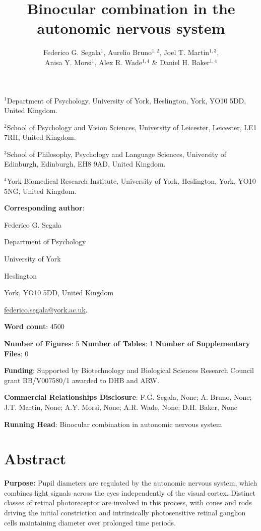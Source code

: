 \documentclass[
]{article}
\title{Binocular combination in the autonomic nervous system}
\author{Federico G. Segala\(^1\), Aurelio Bruno\(^{1,2}\), Joel T. Martin\(^{1,3}\),\\
Anisa Y. Morsi\(^1\), Alex R. Wade\(^{1,4}\) \& Daniel H. Baker\(^{1,4}\)}
\date{}
\begin{document}
\maketitle

\(^1\)Department of Psychology, University of York, Heslington, York, YO10 5DD, United Kingdom.

\(^2\)School of Psychology and Vision Sciences, University of Leicester, Leicester, LE1 7RH, United Kingdom.

\(^3\)School of Philosophy, Psychology and Language Sciences, University of Edinburgh, Edinburgh, EH8 9AD, United Kingdom.

\(^4\)York Biomedical Research Institute, University of York, Heslington, York, YO10 5NG, United Kingdom.

\textbf{Corresponding author}:

Federico G. Segala

Department of Psychology

University of York

Heslington

York, YO10 5DD, United Kingdom

\url{federico.segala@york.ac.uk}.

\textbf{Word count}: 4500

\textbf{Number of Figures}: 5 \textbf{Number of Tables}: 1 \textbf{Number of Supplementary Files}: 0

\textbf{Funding}: Supported by Biotechnology and Biological Sciences Research Council grant BB/V007580/1 awarded to DHB and ARW.

\textbf{Commercial Relationships Disclosure}: F.G. Segala, None; A. Bruno, None; J.T. Martin, None; A.Y. Morsi, None; A.R. Wade, None; D.H. Baker, None

\textbf{Running Head}: Binocular combination in autonomic nervous system

\pagebreak

\hypertarget{abstract}{%
\section{Abstract}\label{abstract}}

\textbf{Purpose:} Pupil diameters are regulated by the autonomic nervous system, which combines light signals across the eyes independently of the visual cortex. Distinct classes of retinal photoreceptor are involved in this process, with cones and rods driving the initial constriction and intrinsically photosensitive retinal ganglion cells maintaining diameter over prolonged time periods.
\end{document}

